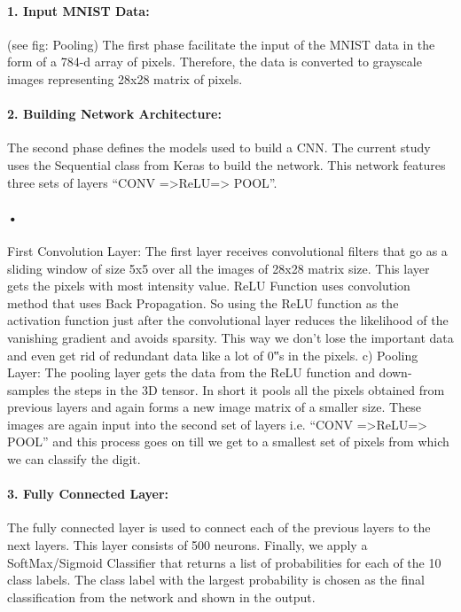 \documentclass{article}
\begin{document}
\paragraph{1. Input MNIST Data:}
  (see fig: Pooling) The first phase facilitate the input of the MNIST data in the form of a 784-d array of pixels. Therefore, the data is converted to grayscale images representing 28x28 matrix of pixels. 
\paragraph{2. Building Network Architecture:}
  The second phase defines the models used to build a CNN. The current study uses the Sequential class from Keras to build the network. This network features three sets of layers “CONV =>ReLU=> POOL”. 
\paragraph{•}
First Convolution Layer: The first layer receives convolutional filters that go as a sliding window of size 5x5 over all the images of 28x28 matrix size. This layer gets the pixels with most intensity value. ReLU Function uses convolution method that uses Back Propagation. So using the ReLU function as the activation function just after the convolutional layer reduces the likelihood of the vanishing gradient and avoids sparsity. This way we don’t lose the important data and even get rid of redundant data like a lot of 0‟s in the pixels. c) Pooling Layer: The pooling layer gets the data from the ReLU function and down-samples the steps in the 3D tensor. In short it pools all the pixels obtained from previous layers and again forms a new image matrix of a smaller size. These images are again input into the second set of layers i.e. “CONV =>ReLU=> POOL” and this process goes on till we get to a smallest set of pixels from which we can classify the digit. 
\paragraph{3. Fully Connected Layer: }
The fully connected layer is used to connect each of the previous layers to the next layers. This layer consists of 500 neurons. Finally, we apply a SoftMax/Sigmoid Classifier that returns a list of probabilities for each of the 10 class labels. The class label with the largest probability is chosen as the final classification from the network and shown in the output. 
\end{document}
